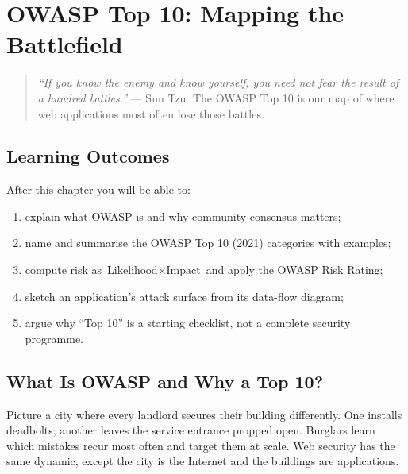 \chapter{OWASP Top 10: Mapping the Battlefield}\label{ch:owasp}

\begin{quote}
\emph{``If you know the enemy and know yourself, you need not fear the result of a hundred battles.''} --- Sun Tzu. The OWASP Top 10 is our map of where web applications most often lose those battles.
\end{quote}

\noindent{}
\vspace{0.4em}

\section*{Learning Outcomes}
After this chapter you will be able to:
\begin{enumerate}[label=(L\arabic*)]
    \item explain what OWASP is and why community consensus matters;
    \item name and summarise the OWASP Top 10 (2021) categories with examples;
    \item compute risk as $\text{Likelihood}\times\text{Impact}$ and apply the OWASP Risk Rating;
    \item sketch an application's attack surface from its data-flow diagram;
    \item argue why ``Top 10'' is a starting checklist, not a complete security programme.
\end{enumerate}

\section{What Is OWASP and Why a Top 10?}\label{sec:what-is-owasp}
Picture a city where every landlord secures their building differently. One installs deadbolts; another leaves the service entrance propped open. Burglars learn which mistakes recur most often and target them at scale. Web security has the same dynamic, except the city is the Internet and the buildings are applications.

